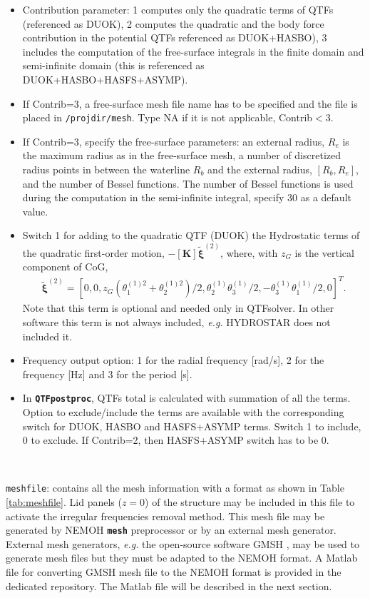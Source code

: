 \documentclass[12pt,a4paper,titlepage]{article}
\newcommand{\bs}{\boldsymbol}
\begin{document}
\begin{itemize}
\begin{itemize}
\item Contribution parameter: 1 computes only the quadratic terms of QTFs (referenced as DUOK), 2 computes the quadratic and the body force contribution in the potential QTFs referenced as DUOK+HASBO), 3 includes the computation of the free-surface integrals in the finite domain and semi-infinite domain (this is referenced as DUOK+HASBO+HASFS+ASYMP).
\item If Contrib=3, a free-surface mesh file name has to be specified and the file is placed in \texttt{/projdir/mesh}. Type NA if it is not applicable, Contrib$<3$.
\item If Contrib=3, specify the free-surface parameters: an external radius, $R_e$ is the maximum radius as in the free-surface mesh, a number of discretized radius points in between the waterline $R_b$ and the external radius,  $[R_b,R_e]$, and the number of Bessel functions. The number of Bessel functions is used during the computation in the semi-infinite integral, specify 30 as a default value.
\item Switch 1 for adding to the quadratic QTF (DUOK) the Hydrostatic terms of the quadratic first-order motion, $-[\bs K] \tilde{\bs \xi}^{(2)}$, where, with $z_G$ is the vertical component of CoG,
\begin{align*}
\tilde{\bs\xi}^{(2)}=[0,0,z_G(\theta_1^{(1)2}+\theta_2^{(1)2})/2,\theta_2^{(1)}\theta_3^{(1)}/2,-\theta_3^{(1)}\theta_1^{(1)}/2,0]^T.
\end{align*}
Note that this term is optional and needed only in QTFsolver. In other software this term is not always included, \emph{e.g.} HYDROSTAR \cite{HYDROSTAR} does not included it.
\item Frequency output option: 1 for the radial frequency [rad/s], 2 for the frequency [Hz] and 3 for the period [s].
\item In \texttt{\textbf{QTFpostproc}}, QTFs total is calculated with summation of all the terms. Option to exclude/include the terms are available with the corresponding switch for DUOK, HASBO and HASFS+ASYMP terms. Switch 1 to include, 0 to exclude. If Contrib=2, then HASFS+ASYMP switch has to be 0.
\end{itemize}
\end{itemize}
\

\noindent
\texttt{meshfile}: contains all the mesh information with a format as shown in Table \ref{tab:meshfile}. Lid panels ($z=0$) of the structure may be included in this file to activate the irregular frequencies removal method. This mesh file may be generated by NEMOH \textbf{\texttt{mesh}} preprocessor or by an external mesh generator.
External mesh generators, \emph{e.g.} the open-source software GMSH \cite{gmsh}, may be used to generate mesh files but they must be adapted to the NEMOH format. A Matlab file for converting GMSH mesh file to the NEMOH format is provided in the dedicated repository. The Matlab file will be described in the next section.\\
\end{document}
